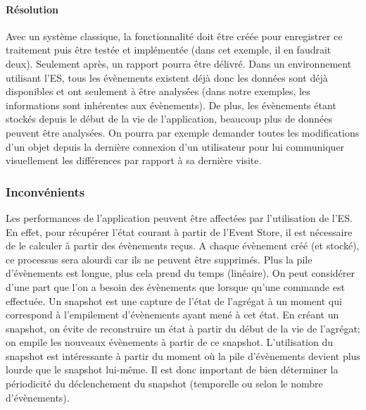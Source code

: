 	\paragraph{Résolution} Avec un système classique, la fonctionnalité doit être 
	créée pour enregistrer ce traitement puis être testée et implémentée (dans cet 
	exemple, il en faudrait deux). Seulement après, un rapport pourra être délivré. 
	Dans un environnement utilisant l'\gls{ES}, tous les évènements existent déjà 
	donc les données sont déjà disponibles et ont seulement à être analysées 
	(dans 
	notre exemples, les informations sont inhérentes aux évènements). De plus, les 
	évènements étant stockés depuis le début de la vie de l'application, beaucoup plus de données peuvent être analysées. On 
		pourra par 
	exemple demander toutes les modifications d'un objet depuis la dernière 
	connexion d'un utilisateur pour lui communiquer visuellement les différences par 
	rapport à sa dernière visite.
	
	
	
	\subsubsection{Inconvénients}
	Les performances de l'application peuvent être affectées par l'utilisation de 
	l'\gls{ES}. En effet, pour récupérer l'état courant à partir de l'Event Store, il est 
	nécessaire de le calculer à partir des évènements reçus.
	A chaque évènement créé (et stocké), ce processus sera alourdi car ils ne 
	peuvent être supprimés. Plus la pile d'évènements est longue, plus cela prend 
	du temps (linéaire). On peut considérer d'une part que l'on a besoin des 
	évènements que lorsque qu'une commande est effectuée. Un \gls{snapshot} est une capture de l'état de l'agrégat à un 
	moment qui correspond à l'empilement d'évènements ayant mené à cet état. En 
	créant un \gls{snapshot}, on évite de reconstruire un état à partir du début de la 
	vie de l'agrégat; on empile les nouveaux évènements à partir de ce snapshot. 
	L'utilisation du \gls{snapshot} est intéressante à partir du moment où la pile 
	d'évènements devient plus lourde que le \gls{snapshot} lui-même. Il est donc 
	important de bien déterminer la périodicité du déclenchement du \gls{snapshot} 
	(temporelle ou selon le nombre d'évènements).
	
